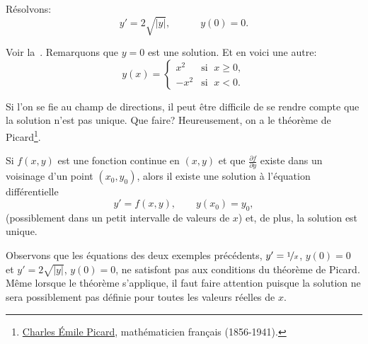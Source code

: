 \begin{example}
	Résolvons:
	\begin{equation*}
		y' = 2 \sqrt{\lvert y \rvert},\quad \qquad y(0) = 0 .
	\end{equation*}

	Voir la~.
	Remarquons que $y=0$ est une solution.  Et en voici une autre:
	\begin{equation*}
		y(x) =	\begin{cases}
				x^2 & \text{si } \; x \geq 0,\\
				-x^2 & \text{si } \; x < 0.
				\end{cases}
	\end{equation*}
\end{example}

Si l'on se fie au champ de directions, il peut être difficile de se rendre compte que la solution n'est pas unique.
Que faire?  Heureusement, on a le théorème de Picard$\!$\footnote{
\href{https://fr.wikipedia.org/wiki/Charles_\%C3\%89mile_Picard}{Charles \'Emile Picard},
mathématicien français
(1856-1941).}.

\begin{theorem}%
\label{slope:picardthm}%
Si $f(x , y)$ est une fonction continue en $(x , y)$ et que $\frac{\partial f}{\partial y}$
existe dans un voisinage d'un point $(x_0 , y_0)$, alors il existe une solution à l'équation différentielle
\begin{equation*}
	y' = f(x,y), \qquad y(x_0) = y_0,
\end{equation*}
(possiblement dans un petit intervalle de valeurs de $x$) et, de plus, la solution est unique.
\end{theorem}

Observons que les équations des deux exemples précédents, $y' = \nicefrac{1}{x}$, $y(0) = 0$ et
$y' = 2 \sqrt{\lvert y \rvert}$, $y(0) = 0$, ne satisfont pas aux conditions du théorème de Picard.
Même lorsque le théorème s'applique, il faut faire attention
puisque la solution ne sera possiblement pas définie pour toutes les valeurs réelles de $x$.


